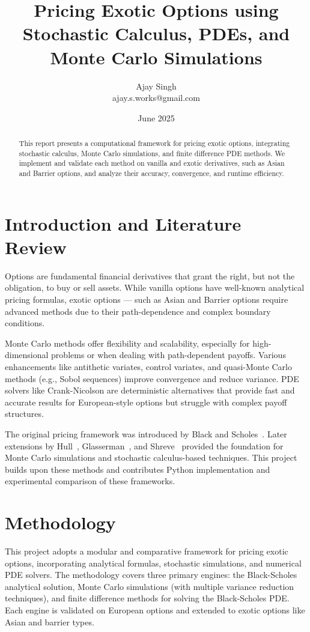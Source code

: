 \documentclass[12pt,a4paper]{article}
\title{Pricing Exotic Options using Stochastic Calculus, PDEs, and Monte Carlo Simulations}
\author{Ajay Singh \\ ajay.s.works@gmail.com}
\date{June 2025}
\begin{document}
\maketitle

\begin{abstract}
This report presents a computational framework for pricing exotic options, integrating stochastic calculus, Monte Carlo simulations, and finite difference PDE methods. We implement and validate each method on vanilla and exotic derivatives, such as Asian and Barrier options, and analyze their accuracy, convergence, and runtime efficiency.
\end{abstract}
\newpage

\tableofcontents
\newpage

\section{Introduction and Literature Review}
Options are fundamental financial derivatives that grant the right, but not the obligation, to buy or sell assets. While vanilla options have well-known analytical pricing formulas, exotic options — such as Asian and Barrier options require advanced methods due to their path-dependence and complex boundary conditions.

Monte Carlo methods offer flexibility and scalability, especially for high-dimensional problems or when dealing with path-dependent payoffs. Various enhancements like antithetic variates, control variates, and quasi-Monte Carlo methods (e.g., Sobol sequences) improve convergence and reduce variance. PDE solvers like Crank-Nicolson are deterministic alternatives that provide fast and accurate results for European-style options but struggle with complex payoff structures.

The original pricing framework was introduced by Black and Scholes~\cite{black1973pricing}. Later extensions by Hull~\cite{hull2018options}, Glasserman~\cite{glasserman2004monte}, and Shreve~\cite{shreve2004stochastic} provided the foundation for Monte Carlo simulations and stochastic calculus-based techniques. This project builds upon these methods and contributes Python implementation and experimental comparison of these frameworks.

\section{Methodology}

This project adopts a modular and comparative framework for pricing exotic options, incorporating analytical formulas, stochastic simulations, and numerical PDE solvers. The methodology covers three primary engines: the Black-Scholes analytical solution, Monte Carlo simulations (with multiple variance reduction techniques), and finite difference methods for solving the Black-Scholes PDE. Each engine is validated on European options and extended to exotic options like Asian and barrier types.
\end{document}
